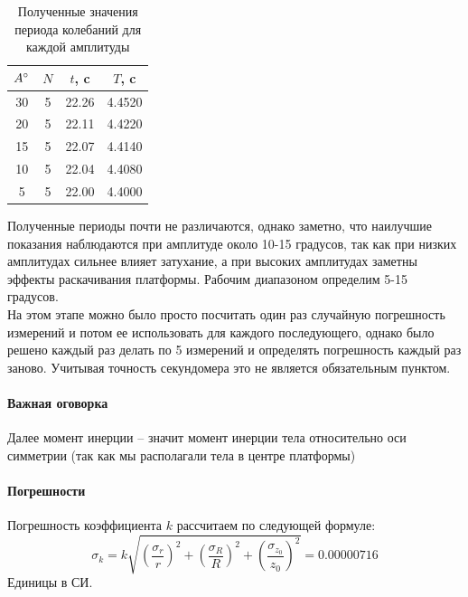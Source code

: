 \documentclass[a4paper,12pt]{article}
\begin{document}
	\begin{table}[H]
		\centering
		\caption{Полученные значения периода колебаний для каждой амплитуды}
		\begin{tabular}{|c|c|c|c|}
			\hline
			$A \degree$ & $N$ & $t$, c & $T$, c \\
			\hline
			30 & 5 & 22.26 & 4.4520 \\
			\hline
			20 & 5 & 22.11 & 4.4220 \\
			\hline
			15 & 5 & 22.07 & 4.4140 \\
			\hline
			10 & 5 & 22.04 & 4.4080 \\
			\hline
			5 & 5 & 22.00 & 4.4000 \\
			\hline
		\end{tabular}
	\end{table}
	
	Полученные периоды почти не различаются, однако заметно, что наилучшие показания наблюдаются при амплитуде около 10-15 градусов, так как при низких амплитудах сильнее влияет затухание, а при высоких амплитудах заметны эффекты раскачивания платформы. Рабочим диапазоном определим 5-15 градусов.\\
	
	На этом этапе можно было просто посчитать один раз случайную погрешность измерений и потом ее использовать для каждого последующего, однако было решено каждый раз делать по 5 измерений и определять погрешность каждый раз заново. Учитывая точность секундомера это не является обязательным пунктом.\\
	
	\paragraph{Важная оговорка}
	
	Далее момент инерции -- значит момент инерции тела относительно оси симметрии (так как мы располагали тела в центре платформы)
	
	\paragraph{Погрешности}
	Погрешность коэффициента $k$ рассчитаем по следующей формуле:
	\begin{equation}
		\sigma_k=k\sqrt{\left(\frac{\sigma_r}{r}\right)^2+\left(\frac{\sigma_R}{R}\right)^2+\left(\frac{\sigma_{z_0}}{z_0}\right)^2}=0.00000716
	\end{equation}
	Единицы в СИ.\\
	
\end{document}

